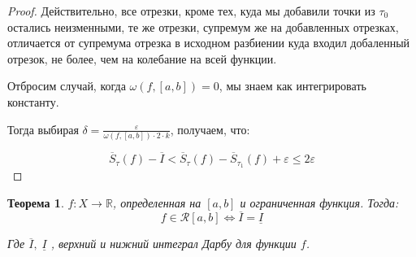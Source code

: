 \documentclass{article}
\theoremstyle{plain}
\newtheorem{theorem}{Теорема}
\theoremstyle{definition}
\theoremstyle{remark}
\renewcommand{\*}{\cdot}
\begin{document}
\begin{proof}
    Действительно, все отрезки, кроме тех, куда мы добавили точки из $\tau_0$ остались неизменными, те же 
    отрезки, супремум же на добавленных отрезках, отличается от супремума отрезка в исходном разбиении куда 
    входил добаленный отрезок, не более, чем на колебание на всей функции.

    Отбросим случай, когда $\omega(f, [a,b]) = 0$, мы знаем как интегрировать константу.

    Тогда выбирая $\delta = \frac{\varepsilon}{\omega(f, [a,b]) \* 2 \* k}$, получаем, что:

    \[
        \overline{S}_{\tau}(f) - \overline{I} < \overline{S}_{\tau}(f) - \overline{S}_{\tau_1}(f) + \varepsilon \leq 2 \varepsilon
    \]
\end{proof}

\begin{theorem}
$f: X \rightarrow \mathbb{R}$, определенная на $[a,b]$ и ограниченная функция. Тогда: 
\[
  f \in \mathcal{R}[a,b] \Leftrightarrow \overline{I} = \underline{I}
\]

Где $\overline{I},\; \underline{I}$ , верхний и нижний интеграл Дарбу для функции $f$.
\end{theorem}
\end{document}
